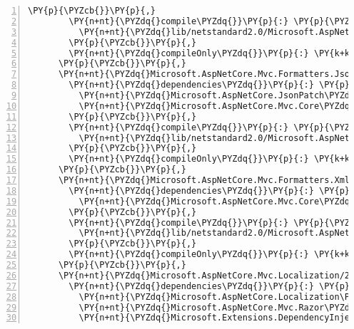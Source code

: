 \begin{Verbatim}[commandchars=\\\{\},numbers=left,firstnumber=1,stepnumber=1,numberblanklines=0]
        \PY{p}{\PYZcb{}}\PY{p}{,}
        \PY{n+nt}{\PYZdq{}compile\PYZdq{}}\PY{p}{:} \PY{p}{\PYZob{}}
          \PY{n+nt}{\PYZdq{}lib/netstandard2.0/Microsoft.AspNetCore.Mvc.DataAnnotations.dll\PYZdq{}}\PY{p}{:} \PY{p}{\PYZob{}}\PY{p}{\PYZcb{}}
        \PY{p}{\PYZcb{}}\PY{p}{,}
        \PY{n+nt}{\PYZdq{}compileOnly\PYZdq{}}\PY{p}{:} \PY{k+kc}{true}
      \PY{p}{\PYZcb{}}\PY{p}{,}
      \PY{n+nt}{\PYZdq{}Microsoft.AspNetCore.Mvc.Formatters.Json/2.1.0\PYZhy{}rc1\PYZhy{}final\PYZdq{}}\PY{p}{:} \PY{p}{\PYZob{}}
        \PY{n+nt}{\PYZdq{}dependencies\PYZdq{}}\PY{p}{:} \PY{p}{\PYZob{}}
          \PY{n+nt}{\PYZdq{}Microsoft.AspNetCore.JsonPatch\PYZdq{}}\PY{p}{:} \PY{l+s+s2}{\PYZdq{}2.1.0\PYZhy{}rc1\PYZhy{}final\PYZdq{}}\PY{p}{,}
          \PY{n+nt}{\PYZdq{}Microsoft.AspNetCore.Mvc.Core\PYZdq{}}\PY{p}{:} \PY{l+s+s2}{\PYZdq{}2.1.0\PYZhy{}rc1\PYZhy{}final\PYZdq{}}
        \PY{p}{\PYZcb{}}\PY{p}{,}
        \PY{n+nt}{\PYZdq{}compile\PYZdq{}}\PY{p}{:} \PY{p}{\PYZob{}}
          \PY{n+nt}{\PYZdq{}lib/netstandard2.0/Microsoft.AspNetCore.Mvc.Formatters.Json.dll\PYZdq{}}\PY{p}{:} \PY{p}{\PYZob{}}\PY{p}{\PYZcb{}}
        \PY{p}{\PYZcb{}}\PY{p}{,}
        \PY{n+nt}{\PYZdq{}compileOnly\PYZdq{}}\PY{p}{:} \PY{k+kc}{true}
      \PY{p}{\PYZcb{}}\PY{p}{,}
      \PY{n+nt}{\PYZdq{}Microsoft.AspNetCore.Mvc.Formatters.Xml/2.1.0\PYZhy{}rc1\PYZhy{}final\PYZdq{}}\PY{p}{:} \PY{p}{\PYZob{}}
        \PY{n+nt}{\PYZdq{}dependencies\PYZdq{}}\PY{p}{:} \PY{p}{\PYZob{}}
          \PY{n+nt}{\PYZdq{}Microsoft.AspNetCore.Mvc.Core\PYZdq{}}\PY{p}{:} \PY{l+s+s2}{\PYZdq{}2.1.0\PYZhy{}rc1\PYZhy{}final\PYZdq{}}
        \PY{p}{\PYZcb{}}\PY{p}{,}
        \PY{n+nt}{\PYZdq{}compile\PYZdq{}}\PY{p}{:} \PY{p}{\PYZob{}}
          \PY{n+nt}{\PYZdq{}lib/netstandard2.0/Microsoft.AspNetCore.Mvc.Formatters.Xml.dll\PYZdq{}}\PY{p}{:} \PY{p}{\PYZob{}}\PY{p}{\PYZcb{}}
        \PY{p}{\PYZcb{}}\PY{p}{,}
        \PY{n+nt}{\PYZdq{}compileOnly\PYZdq{}}\PY{p}{:} \PY{k+kc}{true}
      \PY{p}{\PYZcb{}}\PY{p}{,}
      \PY{n+nt}{\PYZdq{}Microsoft.AspNetCore.Mvc.Localization/2.1.0\PYZhy{}rc1\PYZhy{}final\PYZdq{}}\PY{p}{:} \PY{p}{\PYZob{}}
        \PY{n+nt}{\PYZdq{}dependencies\PYZdq{}}\PY{p}{:} \PY{p}{\PYZob{}}
          \PY{n+nt}{\PYZdq{}Microsoft.AspNetCore.Localization\PYZdq{}}\PY{p}{:} \PY{l+s+s2}{\PYZdq{}2.1.0\PYZhy{}rc1\PYZhy{}final\PYZdq{}}\PY{p}{,}
          \PY{n+nt}{\PYZdq{}Microsoft.AspNetCore.Mvc.Razor\PYZdq{}}\PY{p}{:} \PY{l+s+s2}{\PYZdq{}2.1.0\PYZhy{}rc1\PYZhy{}final\PYZdq{}}\PY{p}{,}
          \PY{n+nt}{\PYZdq{}Microsoft.Extensions.DependencyInjection\PYZdq{}}\PY{p}{:} \PY{l+s+s2}{\PYZdq{}2.1.0\PYZhy{}rc1\PYZhy{}final\PYZdq{}}\PY{p}{,}

\end{Verbatim}

